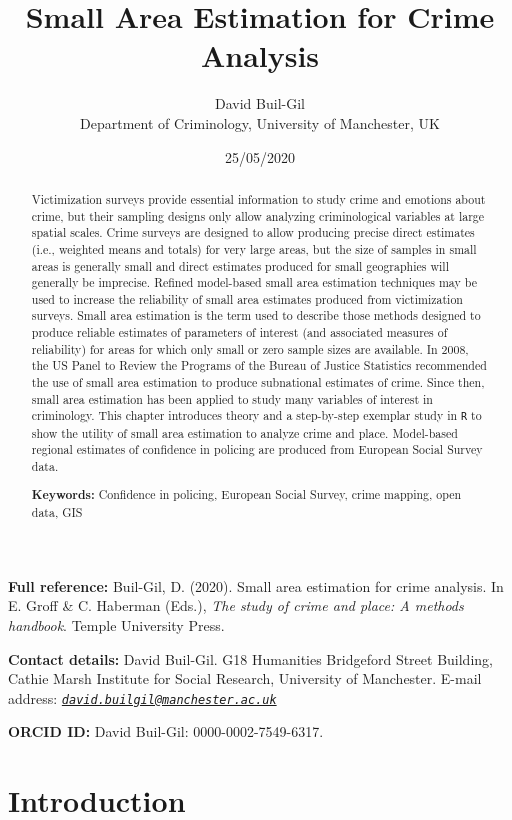 \documentclass[
]{article}
\title{Small Area Estimation for Crime Analysis}
\author{David Buil-Gil\\
Department of Criminology, University of Manchester, UK}
\date{25/05/2020}
\begin{document}
\maketitle
\begin{abstract}
Victimization surveys provide essential information to study crime and
emotions about crime, but their sampling designs only allow analyzing
criminological variables at large spatial scales. Crime surveys are
designed to allow producing precise direct estimates (i.e., weighted
means and totals) for very large areas, but the size of samples in small
areas is generally small and direct estimates produced for small
geographies will generally be imprecise. Refined model-based small area
estimation techniques may be used to increase the reliability of small
area estimates produced from victimization surveys. Small area
estimation is the term used to describe those methods designed to
produce reliable estimates of parameters of interest (and associated
measures of reliability) for areas for which only small or zero sample
sizes are available. In 2008, the US Panel to Review the Programs of the
Bureau of Justice Statistics recommended the use of small area
estimation to produce subnational estimates of crime. Since then, small
area estimation has been applied to study many variables of interest in
criminology. This chapter introduces theory and a step-by-step exemplar
study in \texttt{R} to show the utility of small area estimation to
analyze crime and place. Model-based regional estimates of confidence in
policing are produced from European Social Survey data.

\par

\textbf{Keywords:} Confidence in policing, European Social Survey, crime
mapping, open data, GIS
\end{abstract}

\textbf{Full reference:} Buil-Gil, D. (2020). Small area estimation for
crime analysis. In E. Groff \& C. Haberman (Eds.), \emph{The study of
crime and place: A methods handbook}. Temple University Press.

\textbf{Contact details:} David Buil-Gil. G18 Humanities Bridgeford
Street Building, Cathie Marsh Institute for Social Research, University
of Manchester. E-mail address:
\emph{\href{mailto:david.builgil@manchester.ac.uk}{\nolinkurl{david.builgil@manchester.ac.uk}}}

\textbf{ORCID ID:} David Buil-Gil: 0000-0002-7549-6317.

\hypertarget{introduction}{%
\section{Introduction}\label{introduction}}
\end{document}
